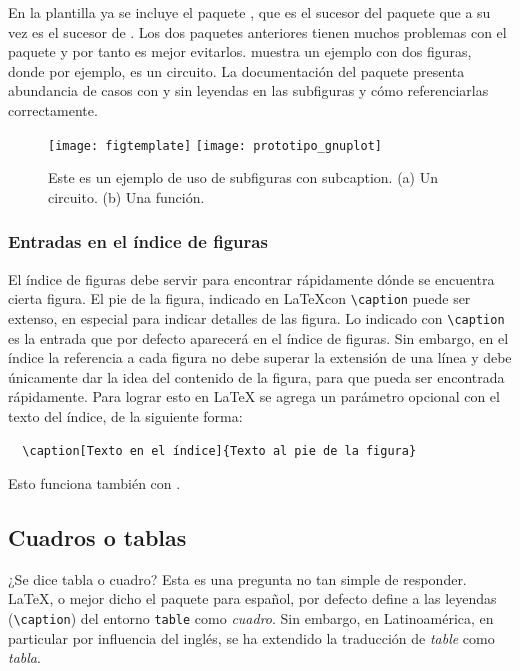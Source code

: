 En la plantilla ya se incluye el paquete , que es el
sucesor del paquete  que a su vez es el sucesor de
.  Los dos paquetes anteriores tienen muchos problemas
con el paquete  y por tanto es mejor evitarlos.
 muestra un ejemplo con dos figuras, donde por
ejemplo,  es un circuito.  La
documentación del paquete  presenta abundancia de
casos con y sin leyendas en las subfiguras y cómo referenciarlas
correctamente.

\begin{figure}[htb]
  \centering
  \subcaptionbox{\label{fig:subfigura_a}}%
    {\texttt{[image: figtemplate]}}
  \subcaptionbox{\label{fig:subfigura_b}}%
    {\texttt{[image: prototipo\_gnuplot]}}
  \caption[Ejemplo de figuras con subcaption]{Este es un ejemplo de
      uso de subfiguras con subcaption.  (a) Un circuito.  (b) Una
      función.}
  \label{fig:subfiguras}
\end{figure}


\subsubsection{Entradas en el índice de figuras}

El índice de figuras debe servir para encontrar rápidamente dónde se
encuentra cierta figura.  El pie de la figura, indicado en \LaTeX con
\verb+\caption+ puede ser extenso, en especial para indicar detalles
de las figura.  Lo indicado con \verb+\caption+ es la entrada que por
defecto aparecerá en el índice de figuras.  Sin embargo, en el índice
la referencia a cada figura no debe superar la extensión de una línea
y debe únicamente dar la idea del contenido de la figura, para que
pueda ser encontrada rápidamente.  Para lograr esto en \LaTeX{} se
agrega un parámetro opcional con el texto del índice, de la siguiente
forma:
\begin{verbatim}
  \caption[Texto en el índice]{Texto al pie de la figura}
\end{verbatim}
Esto funciona también con \lastablas.


\subsection{Cuadros o tablas}

¿Se dice tabla o cuadro? Esta es una pregunta no tan simple de
responder.  \LaTeX, o mejor dicho el paquete  para
español, por defecto define a las leyendas (\verb+\caption+) del
entorno \verb+table+ como \emph{cuadro}.  Sin embargo, en
Latinoamérica, en particular por influencia del inglés, se ha
extendido la traducción de \emph{table} como \emph{tabla}.

